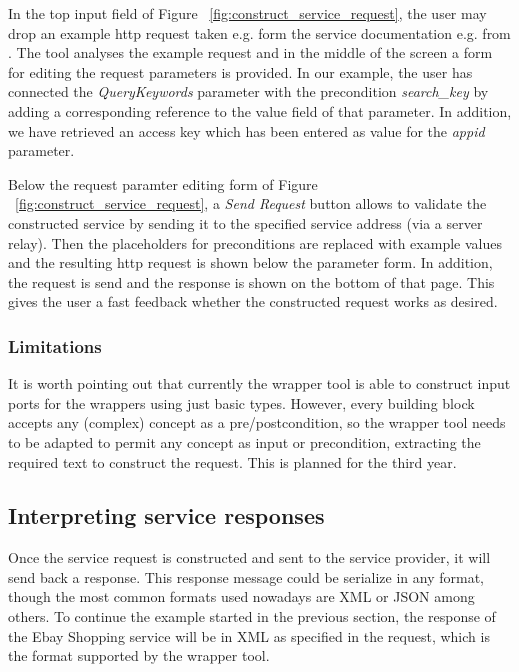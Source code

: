 \documentclass{fast_latex}
\begin{document}
In the top input field of Figure ~\ref{fig:construct_service_request}, the user may drop an example http request taken e.g. form the service documentation e.g. from \cite{eBayShoppingAPIs}. The tool analyses the example request and in the middle of the screen a form for editing the request parameters is provided. In our example, the user has connected the \textit{QueryKeywords} parameter with the precondition \textit{search\_key} by adding a corresponding reference to the value field of that parameter. In addition, we have retrieved an access key which has been entered as value for the \textit{appid} parameter.

Below the request paramter editing form of Figure ~\ref{fig:construct_service_request}, a \textit{Send Request} button allows to validate the constructed service by sending it to the specified service address (via a server relay). Then the placeholders for preconditions are replaced with example values and the resulting http request is shown below the parameter form. In addition, the request is send and the response is shown on the bottom of that page. This gives the user a fast feedback whether the constructed request works as desired. 

\subsubsection{Limitations} %
\label{ssub:limitations}

It is worth pointing out that currently the wrapper tool is able to construct input ports for the wrappers using just basic types. However, every building block accepts any (complex) concept as a pre/postcondition, so the wrapper tool needs to be adapted to permit any concept as input or precondition, extracting the required text to construct the request. This is planned for the third year. 



\subsection{Interpreting service responses} %
\label{sub:interpreting_service_responses}

Once the service request is constructed and sent to the service provider, it will send back a response. This response message could be serialize in any format, though the most common formats used nowadays are XML or JSON among others. To continue the example started in the previous section, the response of the Ebay Shopping service will be in XML as specified in the request, which is the format supported by the wrapper tool.
\end{document}
